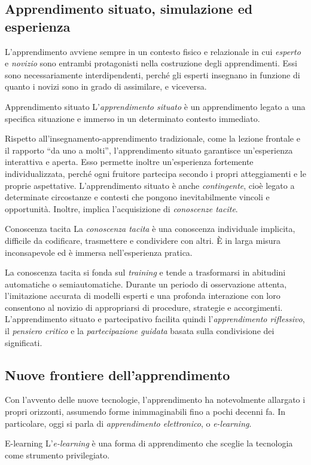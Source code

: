 \documentclass[a4paper]{article}
\begin{document}
\subsection{Apprendimento situato, simulazione ed esperienza}
L'apprendimento avviene sempre in un contesto fisico e relazionale in cui \emph{esperto} e \emph{novizio} sono entrambi protagonisti nella costruzione degli apprendimenti. Essi sono necessariamente interdipendenti, perché gli esperti insegnano in funzione di quanto i novizi sono in grado di assimilare, e viceversa.
\begin{snippetdefinition}{Apprendimento situato}
    L'\emph{apprendimento situato} è un apprendimento legato a una specifica situazione e immerso in un determinato contesto immediato.
\end{snippetdefinition}
Rispetto all'insegnamento-apprendimento tradizionale, come la lezione frontale e il rapporto ``da uno a molti'', l'apprendimento situato garantisce un'esperienza interattiva e aperta. Esso permette inoltre un'esperienza fortemente individualizzata, perché ogni fruitore partecipa secondo i propri atteggiamenti e le proprie aspettative.
L'apprendimento situato è anche \emph{contingente}, cioè legato a determinate circostanze e contesti che pongono inevitabilmente vincoli e opportunità. Inoltre, implica l'acquisizione di \emph{conoscenze tacite}.
\begin{snippetdefinition}{Conoscenza tacita}
    La \emph{conoscenza tacita} è una conoscenza individuale implicita, difficile da codificare, trasmettere e condividere con altri. È in larga misura inconsapevole ed è immersa nell'esperienza pratica.
\end{snippetdefinition}
La conoscenza tacita si fonda sul \emph{training} e tende a trasformarsi in abitudini automatiche o semiautomatiche. Durante un periodo di osservazione attenta, l'imitazione accurata di modelli esperti e una profonda interazione con loro consentono al novizio di appropriarsi di procedure, strategie e accorgimenti.
L'apprendimento situato e partecipativo facilita quindi l'\emph{apprendimento riflessivo}, il \emph{pensiero critico} e la \emph{partecipazione guidata} basata sulla condivisione dei significati.
\subsection{Nuove frontiere dell'apprendimento}
Con l'avvento delle nuove tecnologie, l'apprendimento ha notevolmente allargato i propri orizzonti, assumendo forme inimmaginabili fino a pochi decenni fa. In particolare, oggi si parla di \emph{apprendimento elettronico}, o \emph{e-learning}.
\begin{snippetdefinition}{E-learning}
    L'\emph{e-learning} è una forma di apprendimento che sceglie la tecnologia come strumento privilegiato.
\end{snippetdefinition}
\end{document}
